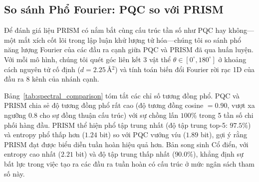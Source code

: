 \documentclass[10pt,twocolumn,letterpaper]{article}
\begin{document}
\subsection{So sánh Phổ Fourier: PQC so với PRISM}
\label{sec:spectral_comparison}

Để đánh giá liệu PRISM có nắm bắt cùng cấu trúc tần số như PQC hay không---một mắt xích cốt lõi trong lập luận khử lượng tử hóa---chúng tôi so sánh phổ năng lượng Fourier của các đầu ra cạnh giữa PQC và PRISM đã qua huấn luyện. Với mỗi mô hình, chúng tôi quét góc liên kết 3 vật thể $\theta \in [0^\circ, 180^\circ]$ ở khoảng cách nguyên tử cố định ($d = 2.25$\,\AA$^2$) và tính toán biến đổi Fourier rời rạc 1D của đầu ra 8 kênh của nhánh cạnh.

Bảng~\ref{tab:spectral_comparison} tóm tắt các chỉ số tương đồng phổ. PQC và PRISM chia sẻ độ tương đồng phổ rất cao (độ tương đồng cosine $= 0.90$, vượt xa ngưỡng $0.8$ cho sự đồng thuận cấu trúc) với sự chồng lấn $100\%$ trong 5 tần số chi phối hàng đầu. PRISM thể hiện phổ tập trung nhất (độ tập trung top-5: $97.5\%$) và entropy phổ thấp hơn ($1.24$ bit) so với PQC vướng víu ($1.89$ bit), gợi ý rằng PRISM đạt được biểu diễn tuần hoàn hiệu quả hơn. Bản song sinh Cổ điển, với entropy cao nhất ($2.21$ bit) và độ tập trung thấp nhất ($90.0\%$), khẳng định sự bất lực trong việc tạo ra các đầu ra tuần hoàn có cấu trúc ở mức ngân sách tham số này.

\begin{table}[h]
\centering
\small
\caption{\textbf{So sánh Phổ Fourier} của các đầu ra nhánh cạnh đã huấn luyện (HOMO, $N=1{,}000$, hạt giống 42). Độ tương đồng Cosine (Đồng độ Cos) và sự chồng lấn top-5 tần số được tính giữa từng mô hình và đường cơ sở Q-PRISM.}
\label{tab:spectral_comparison}
\end{table}
\end{document}
